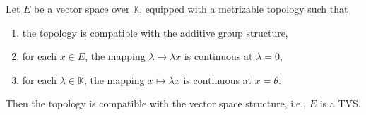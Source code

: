 Let $E$ be a vector space over $\mathbb{K}$, equipped with a metrizable topology such that
\begin{enumerate}
\item[(i)] the topology is compatible with the additive group structure,
\item[(ii)] for each $x \in E$, the mapping $\lambda \mapsto \lambda x$ is continuous at $\lambda = 0$,
\item[(iii)] for each $\lambda \in \mathbb{K}$, the mapping $x \mapsto \lambda x$ is continuous at $x = \theta$.
\end{enumerate}
Then the topology is compatible with the vector space structure, i.e., $E$ is a TVS.
